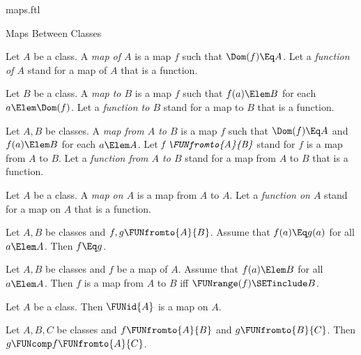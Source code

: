 \documentclass{stex}
\begin{document}
\begin{smodule}{maps.ftl}
\begin{sfragment}{Maps Between Classes}
  \begin{definition}[forthel,for={map,function}]
    Let $A$ be a class.
    A \emph{map of $A$} is a map $f$ such that $\Dom(f) \Eq A$.
    Let a \emph{function of $A$} stand for a map of $A$ that is a function.
  \end{definition}

  \begin{definition}[forthel,for={map,function}]
    Let $B$ be a class.
    A \emph{map to $B$} is a map $f$ such that $f(a) \Elem B$ for each $a \Elem \Dom(f)$.
    Let a \emph{function to $B$} stand for a map to $B$ that is a function.
  \end{definition}

  \begin{definition}[forthel,for={map,FUNfromto,function}]
    Let $A, B$ be classes.
    A \emph{map from $A$ to $B$} is a map $f$ such that $\Dom(f) \Eq A$ and $f(a) \Elem B$ for each $a \Elem A$.
    Let $\emph{f \FUNfromto{A}{B}}$ stand for $f$ is a map from $A$ to $B$.
    Let a \emph{function from $A$ to $B$} stand for a map from $A$ to $B$ that is a function.
  \end{definition}

  \begin{definition}[forthel,for={map,function}]
    Let $A$ be a class.
    A \emph{map on $A$} is a map from $A$ to $A$.
    Let a \emph{function on $A$} stand for a map on $A$ that is a function.
  \end{definition}

  \begin{proposition}[forthel]
    Let $A, B$ be classes and $f, g \FUNfromto{A}{B}$.
    Assume that $f(a) \Eq g(a)$ for all $a \Elem A$.
    Then $f \Eq g$.
  \end{proposition}

  \begin{proposition}
    Let $A, B$ be classes and $f$ be a map of $A$.
    Assume that $f(a) \Elem B$ for all $a \Elem A$.
    Then $f$ is a map from $A$ to $B$ iff $\FUNrange(f) \SETinclude B$.
  \end{proposition}

  \begin{proposition}[forthel]
    Let $A$ be a class.
    Then $\FUNid{A}$ is a map on $A$.
  \end{proposition}

  \begin{proposition}[forthel]
    Let $A, B, C$ be classes and $f \FUNfromto{A}{B}$ and $g \FUNfromto{B}{C}$.
    Then $g \FUNcomp f \FUNfromto{A}{C}$.
  \end{proposition}


\end{sfragment}
\end{smodule}
\end{document}

